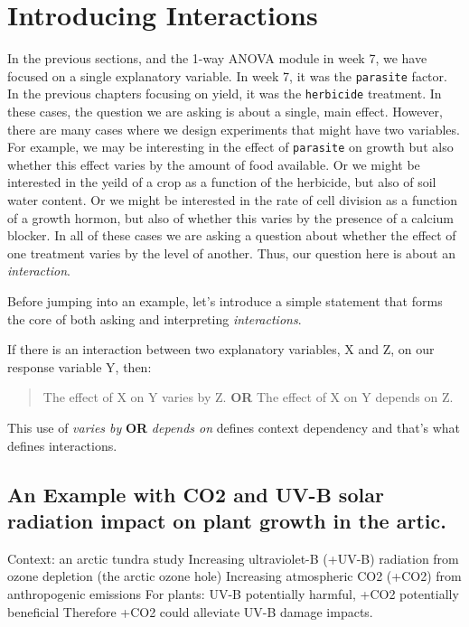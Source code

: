 \documentclass[
]{book}
\begin{document}
\section{Introducing Interactions}\label{introducing-interactions}

In the previous sections, and the 1-way ANOVA module in week 7, we have focused on a single explanatory variable. In week 7, it was the \texttt{parasite} factor. In the previous chapters focusing on yield, it was the \texttt{herbicide} treatment. In these cases, the question we are asking is about a single, main effect. However, there are many cases where we design experiments that might have two variables. For example, we may be interesting in the effect of \texttt{parasite} on growth but also whether this effect varies by the amount of food available. Or we might be interested in the yeild of a crop as a function of the herbicide, but also of soil water content. Or we might be interested in the rate of cell division as a function of a growth hormon, but also of whether this varies by the presence of a calcium blocker. In all of these cases we are asking a question about whether the effect of one treatment varies by the level of another. Thus, our question here is about an \emph{interaction}.

Before jumping into an example, let's introduce a simple statement that forms the core of both asking and interpreting \emph{interactions}.

If there is an interaction between two explanatory variables, X and Z, on our response variable Y, then:

\begin{quote}
The effect of X on Y varies by Z. \textbf{OR} The effect of X on Y depends on Z.
\end{quote}

This use of \emph{varies by} \textbf{OR} \emph{depends on} defines context dependency and that's what defines interactions.

\subsection{An Example with CO2 and UV-B solar radiation impact on plant growth in the artic.}\label{an-example-with-co2-and-uv-b-solar-radiation-impact-on-plant-growth-in-the-artic.}

Context: an arctic tundra study
Increasing ultraviolet-B (+UV-B) radiation from ozone depletion (the arctic ozone hole)
Increasing atmospheric CO2 (+CO2) from anthropogenic emissions
For plants: UV-B potentially harmful, +CO2 potentially beneficial
Therefore +CO2 could alleviate UV-B damage impacts.
\end{document}
